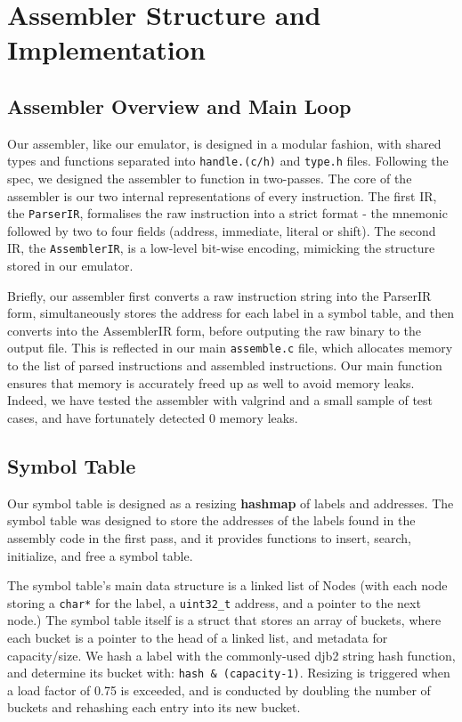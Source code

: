 \documentclass{article}
\begin{document}
\vspace*{-1em}

\vspace{0.3em}


\section{Assembler Structure and Implementation}
\subsection{Assembler Overview and Main Loop}

Our assembler, like our emulator, is designed in a modular fashion, with shared types and functions separated into \verb|handle.(c/h)| and \verb|type.h| files. Following the spec, we designed the assembler to function in two-passes. The core of the assembler is our two internal representations of every instruction. The first IR, the 
\verb|ParserIR|, formalises the raw instruction into a strict format - the mnemonic followed by two to four fields (address, immediate, literal or shift). The second IR, the \verb|AssemblerIR|, is a low-level bit-wise encoding, mimicking the structure stored in our emulator. 

Briefly, our assembler first converts a raw instruction string into the ParserIR form, simultaneously stores the address for each label in a symbol table, and then converts into the AssemblerIR form, before outputing the raw binary to the output file. This is reflected in our main \verb|assemble.c| file, which allocates memory to the list of parsed instructions and assembled instructions. Our main function ensures that memory is accurately freed up as well to avoid memory leaks. Indeed, we have tested the assembler with valgrind and a small sample of test cases, and have fortunately detected 0 memory leaks. 

\subsection{Symbol Table}

Our symbol table is designed as a resizing \textbf{hashmap} of labels and addresses. The symbol table was designed to store the addresses of the labels found in the assembly code in the first pass, and it provides functions to insert, search, initialize, and free a symbol table. 

The symbol table's main data structure is a linked list of Nodes (with each node storing a \verb|char*| for the label, a \verb|uint32_t| address, and a pointer to the next node.) The symbol table itself is a struct that stores an array of buckets, where each bucket is a pointer to the head of a linked list, and metadata for capacity/size. We hash a label with the commonly-used djb2 string hash function, and determine its bucket with: \verb|hash & (capacity-1)|. Resizing is triggered when a load factor of 0.75 is exceeded, and is conducted by doubling the number of buckets and rehashing each entry into its new bucket. 
\end{document}
